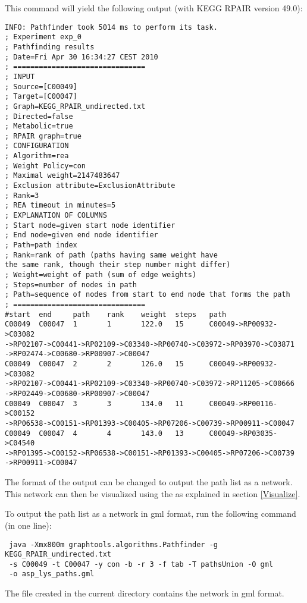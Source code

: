 This command will yield the following output (with KEGG RPAIR version 49.0):

\begin{lstlisting}
INFO: Pathfinder took 5014 ms to perform its task.
; Experiment exp_0
; Pathfinding results
; Date=Fri Apr 30 16:34:27 CEST 2010
; ===============================
; INPUT
; Source=[C00049]
; Target=[C00047]
; Graph=KEGG_RPAIR_undirected.txt
; Directed=false
; Metabolic=true
; RPAIR graph=true
; CONFIGURATION
; Algorithm=rea
; Weight Policy=con
; Maximal weight=2147483647
; Exclusion attribute=ExclusionAttribute
; Rank=3
; REA timeout in minutes=5
; EXPLANATION OF COLUMNS
; Start node=given start node identifier
; End node=given end node identifier
; Path=path index
; Rank=rank of path (paths having same weight have 
the same rank, though their step number might differ)
; Weight=weight of path (sum of edge weights)
; Steps=number of nodes in path
; Path=sequence of nodes from start to end node that forms the path
; ===============================
#start  end     path    rank    weight  steps   path
C00049  C00047  1       1       122.0   15      C00049->RP00932->C03082
->RP02107->C00441->RP02109->C03340->RP00740->C03972->RP03970->C03871
->RP02474->C00680->RP00907->C00047
C00049  C00047  2       2       126.0   15      C00049->RP00932->C03082
->RP02107->C00441->RP02109->C03340->RP00740->C03972->RP11205->C00666
->RP02449->C00680->RP00907->C00047
C00049  C00047  3       3       134.0   11      C00049->RP00116->C00152
->RP06538->C00151->RP01393->C00405->RP07206->C00739->RP00911->C00047
C00049  C00047  4       4       143.0   13      C00049->RP03035->C04540
->RP01395->C00152->RP06538->C00151->RP01393->C00405->RP07206->C00739
->RP00911->C00047
\end{lstlisting}

The format of the output can be changed to output the path list as a network.
This network can then be visualized using the  as
explained in section \ref{Visualize}.

To output the path list as a network in gml format, run the following command
(in one line):

\begin{lstlisting}
 java -Xmx800m graphtools.algorithms.Pathfinder -g KEGG_RPAIR_undirected.txt 
 -s C00049 -t C00047 -y con -b -r 3 -f tab -T pathsUnion -O gml 
 -o asp_lys_paths.gml
\end{lstlisting}

The file  created in the current directory contains
the network in gml format.

